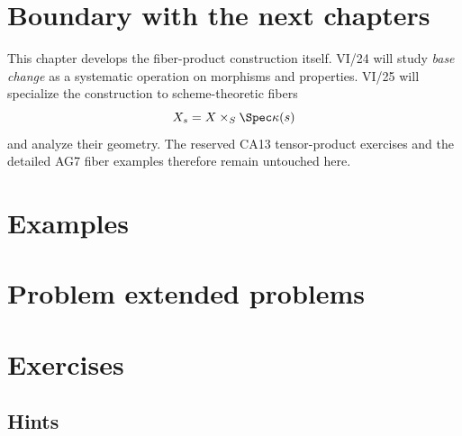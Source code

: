 \section{Boundary with the next chapters}
This chapter develops the fiber-product construction itself.  VI/24 will study \emph{base change}
as a systematic operation on morphisms and properties.  VI/25 will specialize the construction to
scheme-theoretic fibers
\[
X_s=X\times_S\Spec\kappa(s)
\]
and analyze their geometry.  The reserved CA13 tensor-product exercises and the detailed AG7 fiber
examples therefore remain untouched here.

\section{Examples}



\section{Problem extended problems}





















\section{Exercises}

\ifdefined\IncludeExerciseHints
\subsection*{Hints}

\fi

